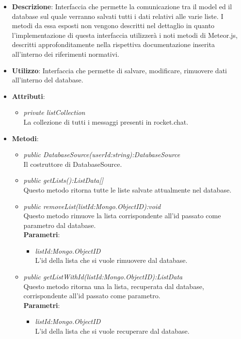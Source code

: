 \begin{itemize}
\item \textbf{Descrizione}: Interfaccia che permette la comunicazione tra il model ed il database sul quale verranno salvati tutti i dati relativi alle varie liste. I metodi da essa esposti non vengono descritti nel dettaglio in quanto l'implementazione di questa interfaccia utilizzerà i noti metodi di Meteor.js, descritti approfonditamente nella rispettiva documentazione inserita all'interno dei riferimenti normativi.
\item \textbf{Utilizzo}: Interfaccia che permette di salvare, modificare, rimuovere dati all'interno del database.
\item \textbf{Attributi}:
	\begin{itemize}
		\item \textit{private listCollection}\\
		La collezione di tutti i messaggi presenti in rocket.chat.
	\end{itemize}
\item \textbf{Metodi}:
	\begin{itemize}
	\item \textit{public DatabaseSource(userId:string):DatabaseSource}\\
	Il costruttore di DatabaseSource.
	 
	\item \textit{public getLists():ListData[]}\\
	Questo metodo ritorna tutte le liste salvate attualmente nel database.
	\item \textit{public removeList(listId:Mongo.ObjectID):void}\\
	Questo metodo rimuove la lista corrispondente all'id passato come parametro dal database.
				\\ \textbf{Parametri}: \begin{itemize}
			\item \textit{listId:Mongo.ObjectID}\\
			L'id della lista che si vuole rimuovere dal database.
			\end{itemize} 
			
	\item \textit{public getListWithId(listId:Mongo.ObjectID):ListData}\\
	Questo metodo ritorna una la lista, recuperata dal database, corrispondente all'id passato come parametro.
				\\ \textbf{Parametri}: \begin{itemize}
			\item \textit{listId:Mongo.ObjectID}\\
			L'id della lista che si vuole recuperare dal database.
			\end{itemize} 
			

\end{itemize}
\end{itemize}
